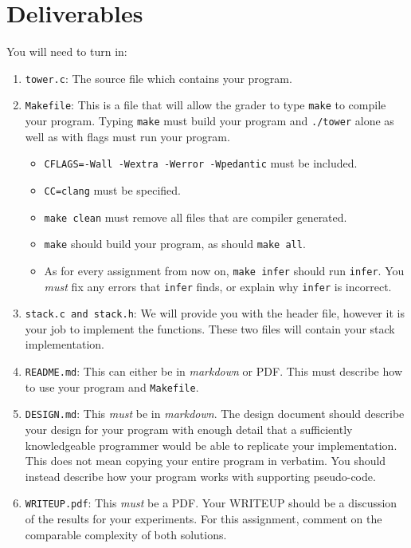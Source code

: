 \documentclass[11pt]{article}
\begin{document}
\section{Deliverables}

\noindent You will need to turn in:

\begin{enumerate}
  \item \texttt{tower.c}: The source file which contains your program.

  \item \texttt{Makefile}: This is a file that will allow the grader to type \texttt{make} to compile your program. Typing \texttt{make} must build your program and \texttt{./tower} alone as well as with flags must run your program.
  \begin{itemize}
    \item \texttt{CFLAGS=-Wall -Wextra -Werror -Wpedantic} must be included.
    \item \texttt{CC=clang} must be specified.
    \item \texttt{make clean} must remove all files that are compiler generated.
    \item \texttt{make} should build your program, as should \texttt{make all}.
\item As for every assignment from now on, \texttt{make infer} should run
\texttt{infer}. You \emph{must} fix any errors that \texttt{infer} finds, or
explain why \texttt{infer} is incorrect.
  \end{itemize}

  \item \texttt{stack.c and stack.h}: We will provide you with the header file, however it is your job to implement the functions. These two files will contain your stack implementation.

  \item \texttt{README.md}: This can either be in \emph{markdown} or PDF. This must describe how to use your program and \texttt{Makefile}.

  \item \texttt{DESIGN.md}: This \emph{must} be in \emph{markdown}. The design document
  should describe your design for your program with enough detail
  that a sufficiently knowledgeable programmer would be able to
  replicate your implementation. This does not mean copying your
  entire program in verbatim. You should instead describe how your
  program works with supporting pseudo-code.

  \item \texttt{WRITEUP.pdf}: This \emph{must} be a PDF. Your WRITEUP should be a discussion of the results for your
  experiments. For this assignment, comment on the comparable complexity of both solutions.

\end{enumerate}
\end{document}
